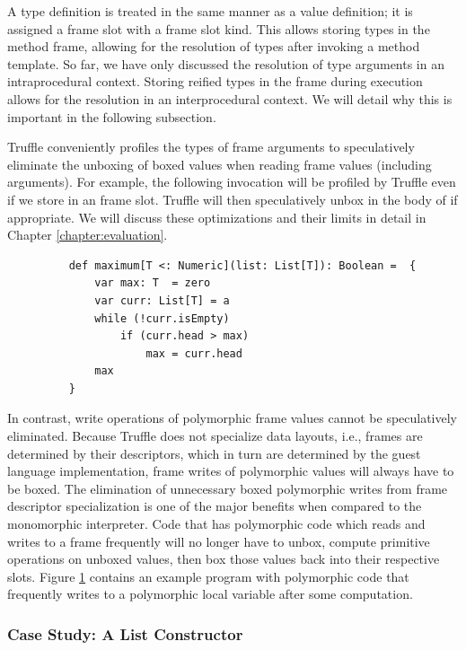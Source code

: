 A type definition is treated in the same manner as a value definition; it is assigned a frame slot with a  frame slot kind.
This allows storing types in the method frame, allowing for the resolution of types after invoking a method template.
So far, we have only discussed the resolution of type arguments in an intraprocedural context.
Storing reified types in the frame during execution allows for the resolution in an interprocedural context.
We will detail why this is important in the following subsection.

Truffle conveniently profiles the types of frame arguments to speculatively eliminate the unboxing of boxed values when reading frame values (including arguments). 
For example, the following invocation  will be profiled by Truffle even if we store  in an  frame slot.
Truffle will then speculatively unbox  in the body of  if appropriate.
We will discuss these optimizations and their limits in detail in Chapter \ref{chapter:evaluation}.

\begin{figure}[!htb]
	\begin{verbatim}
	def maximum[T <: Numeric](list: List[T]): Boolean =  {
		var max: T  = zero
		var curr: List[T] = a
		while (!curr.isEmpty) 
			if (curr.head > max)
				max = curr.head 
		max
	}
	\end{verbatim}
	\caption{}
	\label{impl:list-max}
\end{figure}

In contrast, write operations of polymorphic frame values cannot be speculatively eliminated. 
Because Truffle does not specialize data layouts, i.e., frames are determined by their descriptors, which in turn are determined by the guest language implementation, frame writes of polymorphic values will always have to be boxed.
The elimination of unnecessary boxed polymorphic writes from frame descriptor specialization is one of the major benefits when compared to the monomorphic interpreter.
Code that has polymorphic code which reads and writes to a frame frequently will no longer have to unbox, compute primitive operations on unboxed values, then box those values back into their respective slots.
Figure \ref{impl:list-max} contains an example program with polymorphic code that frequently writes to a polymorphic local variable after some computation.

\subsubsection*{Case Study: A List Constructor}

